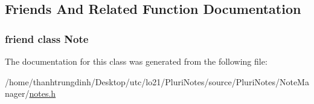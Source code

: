 \subsection{Friends And Related Function Documentation}
\subsubsection[{\texorpdfstring{Note}{Note}}]{\setlength{\rightskip}{0pt plus 5cm}friend class {\bf Note}\hspace{0.3cm}{\ttfamily [friend]}}\hypertarget{classNote_1_1Const__Iterator_a93d7e72623acdfa5b079a11fbf2d9f9d}{}\label{classNote_1_1Const__Iterator_a93d7e72623acdfa5b079a11fbf2d9f9d}


The documentation for this class was generated from the following file\+:\begin{DoxyCompactItemize}
\item 
/home/thanhtrungdinh/\+Desktop/utc/lo21/\+Pluri\+Notes/source/\+Pluri\+Notes/\+Note\+Manager/\hyperlink{notes_8h}{notes.\+h}\end{DoxyCompactItemize}
